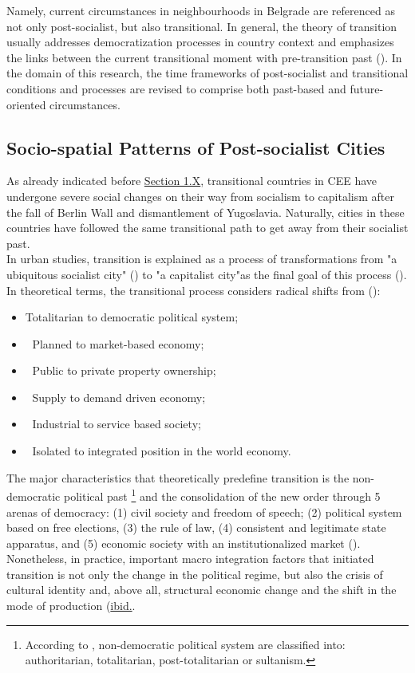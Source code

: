 \documentclass[11pt]{report}
\begin{document}
Namely, current circumstances in neighbourhoods in Belgrade are referenced as not only post-socialist, but also transitional.
In general, the theory of transition usually addresses democratization processes in country context and emphasizes the links between the current transitional moment with pre-transition past (\cite{ Thomas 1998; Holmes Post-Communism 1997}).
In the domain of this research, the time frameworks of post-socialist and transitional conditions and processes are revised to comprise both past-based and future-oriented circumstances.

\subsection{Socio-spatial Patterns of Post-socialist Cities}

As already indicated before \href{(ref introduction section)}{Section 1.X}, transitional countries in CEE have undergone severe social changes on their way from socialism to capitalism after the fall of Berlin Wall and dismantlement of Yugoslavia.
Naturally, cities in these countries have followed the same transitional path to get away from their socialist past.
\\

In urban studies, transition is explained as a process of transformations from "a ubiquitous socialist city" (\citealt{(French and Hamilton 1979 from Mornings after)}) to "a capitalist city"as the final goal of this process (\citealt{Mornings after Nedovic Budic}).
In theoretical terms, the transitional process considers radical shifts from (\citealt{(Petrovic 2009)}): 

\begin{itemize}
\item Totalitarian to democratic political system;
\item Planned to market-based economy;
\item Public to private property ownership; 
\item Supply to demand driven economy; 
\item Industrial to service based society;
\item Isolated to integrated position in the world economy.
\end{itemize}

The major characteristics that theoretically predefine transition is the non-democratic political past
\footnote{According to \href{Linz}{\cite{Linz and Stepan (1996)}}, non-democratic political system are classified into: authoritarian, totalitarian, post-totalitarian or sultanism.}
and the consolidation of the new order through 5 arenas of democracy:
(1) civil society and freedom of speech;
(2) political system based on free elections,
(3) the rule of law,
(4) consistent and legitimate state apparatus, and
(5) economic society with an institutionalized market (\citealt{Thomas 1998}).
Nonetheless, in practice, important macro integration factors that initiated transition is not only the change in the political regime, but also the crisis of cultural identity and, above all, structural economic change and the shift in the mode of production (\href{Thomas}{ibid.}.
\\
\end{document}
